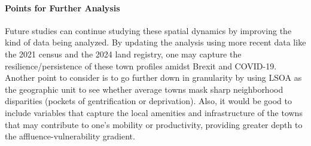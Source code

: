 \documentclass[12pt]{article}
\begin{document}
\paragraph{Points for Further Analysis}
Future studies can continue studying these spatial dynamics by improving the kind of data being analyzed. By updating the analysis using more recent data like the 2021 census and the 2024 land registry, one may capture the resilience/persistence of these town profiles amidst Brexit and COVID-19. Another point to consider is to go further down in granularity by using LSOA as the geographic unit to see whether average towns mask sharp neighborhood disparities (pockets of gentrification or deprivation). Also, it would be good to include variables that capture the local amenities and infrastructure of the towns that may contribute to one's mobility or productivity, providing greater depth to the affluence-vulnerability gradient. 



\end{document}
